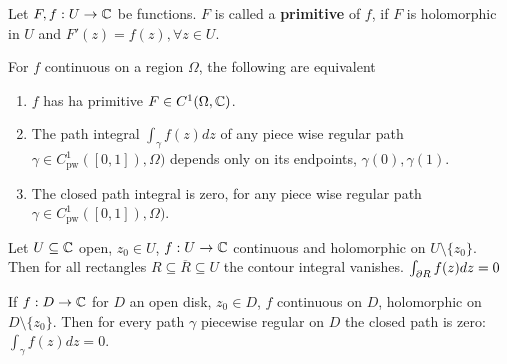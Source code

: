 \begin{definition}[Primitive]
	Let $F,f: U \to \mathbb{C}$ be functions. $F$ is called a \textbf{primitive} of $f$, if $F$ is holomorphic in $U$ and $F'(z) = f(z), \forall z \in U$.
\end{definition}

\begin{theorem}[]
	For $f$ continuous on a region $\Omega$, the following are equivalent
	\begin{enumerate}
		\item $f$ has ha primitive $F \in C^1(\Omega,\mathbb{C})$.
		\item The path integral $\int_{\gamma}f(z) dz$ of any piece wise regular path $\gamma \in C^1_{\text{pw}}([0,1]), \Omega)$ depends only on its endpoints, $\gamma(0), \gamma(1)$.
		\item The closed path integral is zero, for any piece wise regular path $\gamma \in C^1_{\text{pw}}([0,1]), \Omega)$.
	\end{enumerate}
\end{theorem}

\begin{theorem}
	Let $U \subseteq \mathbb{C}$ open, $z_0 \in U$, $f: U \to \mathbb{C}$ continuous and holomorphic on $U \setminus \{z_0\}$. Then for all rectangles $R \subseteq \overline{R} \subseteq U$ the contour integral vanishes. $\int_{\partial R}f(z) dz = 0$
\end{theorem}

If $f: D \to \mathbb{C}$ for $D$ an open disk, $z_0 \in D$, $f$ continuous on $D$, holomorphic on $D \setminus \{z_0\}$. Then for every path $\gamma$ piecewise regular on $D$ the closed path is zero: $\int_{\gamma}f(z) dz = 0$.


